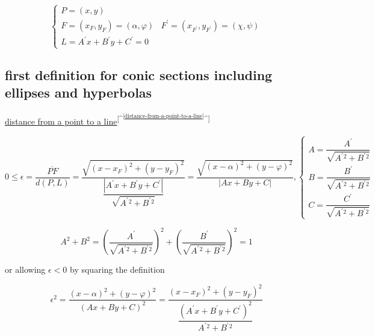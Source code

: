 \documentclass[
]{book}
\theoremstyle{definition}
\theoremstyle{definition}
\theoremstyle{definition}
\theoremstyle{definition}
\theoremstyle{remark}
\begin{document}
\[
\begin{cases}
P=\left(x,y\right)\\
F=\left(x_{{\scriptscriptstyle F}},y_{{\scriptscriptstyle F}}\right)=\left(\alpha,\varphi\right) & F^{\prime}=\left(x_{{\scriptscriptstyle F^{\prime}}},y_{{\scriptscriptstyle F^{\prime}}}\right)=\left(\chi,\psi\right)\\
L=A^{\prime}x+B^{\prime}y+C^{\prime}=0
\end{cases}
\]

\hypertarget{first-definition-for-conic-sections-including-ellipses-and-hyperbolas}{%
\subsection{first definition for conic sections including ellipses and hyperbolas}\label{first-definition-for-conic-sections-including-ellipses-and-hyperbolas}}

\protect\hyperlink{distance-from-a-point-to-a-line}{distance from a point to a line}\textsuperscript{{[}\^{}\textsuperscript{\ref{distance-from-a-point-to-a-line}}\^{}{]}}

\[
0\le\epsilon=\dfrac{\overline{PF}}{d\left(P,L\right)}=\dfrac{\sqrt{\left(x-x_{{\scriptscriptstyle F}}\right)^{2}+\left(y-y_{{\scriptscriptstyle F}}\right)^{2}}}{\dfrac{\left|A^{\prime}x+B^{\prime}y+C^{\prime}\right|}{\sqrt{A^{\prime}{}^{2}+B^{\prime}{}^{2}}}}=\dfrac{\sqrt{\left(x-\alpha\right)^{2}+\left(y-\varphi\right)^{2}}}{\left|Ax+By+C\right|},\begin{cases}
A=\dfrac{A^{\prime}}{\sqrt{A^{\prime}{}^{2}+B^{\prime}{}^{2}}}\\
B=\dfrac{B^{\prime}}{\sqrt{A^{\prime}{}^{2}+B^{\prime}{}^{2}}}\\
C=\dfrac{C^{\prime}}{\sqrt{A^{\prime}{}^{2}+B^{\prime}{}^{2}}}
\end{cases}
\]

\[
A^{2}+B^{2}=\left(\dfrac{A^{\prime}}{\sqrt{A^{\prime}{}^{2}+B^{\prime}{}^{2}}}\right)^{2}+\left(\dfrac{B^{\prime}}{\sqrt{A^{\prime}{}^{2}+B^{\prime}{}^{2}}}\right)^{2}=1
\]

or allowing \(\epsilon<0\) by squaring the definition

\[
\epsilon^{2}=\dfrac{\left(x-\alpha\right)^{2}+\left(y-\varphi\right)^{2}}{\left(Ax+By+C\right)^{2}}=\dfrac{\left(x-x_{{\scriptscriptstyle F}}\right)^{2}+\left(y-y_{{\scriptscriptstyle F}}\right)^{2}}{\dfrac{\left(A^{\prime}x+B^{\prime}y+C^{\prime}\right)^{2}}{A^{\prime}{}^{2}+B^{\prime}{}^{2}}}
\]
\end{document}
